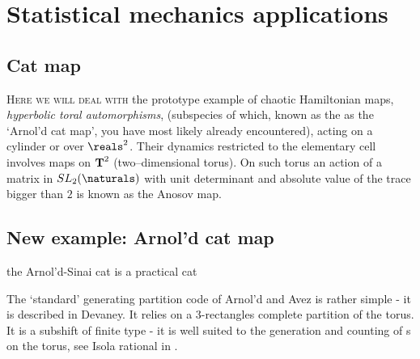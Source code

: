 \chapter{Statistical mechanics applications}
\label{c-appendStatM}  %

\section{Cat map}
\label{sect:CatMap}

\noindent
\lettrine[lines=3,lraise=0.1,lhang=0.2]{H}{ere we will deal with}
the prototype example of chaotic
Hamiltonian maps, \emph{hyperbolic toral automorphisms}, %
(subspecies of which, known as the as the `Arnol'd cat
map', you have most likely already encountered), acting on a
cylinder or over $\reals ^2$. Their dynamics restricted to the
elementary cell involves maps on ${\mbox{\bf T}}^{2}$
(two--dimensional torus). On such torus an action of a matrix in
$SL_2(\naturals)$ with unit determinant and absolute value of the trace
bigger than $2$ is known as the Anosov map.

\section{New example: Arnol'd cat map}
\label{sect:ArnCatMap}

\begin{bartlett}{
the Arnol'd-Sinai cat is a practical cat
                }
\end{bartlett}

The `standard' generating partition code of Arnol'd and Avez
is rather simple - it is described in Devaney.
It relies on a 3-rectangles complete partition of the torus. It is a
subshift of finite type - it is well suited to the generation and
counting of \po s on the torus, see Isola rational
{\tzeta} in .

